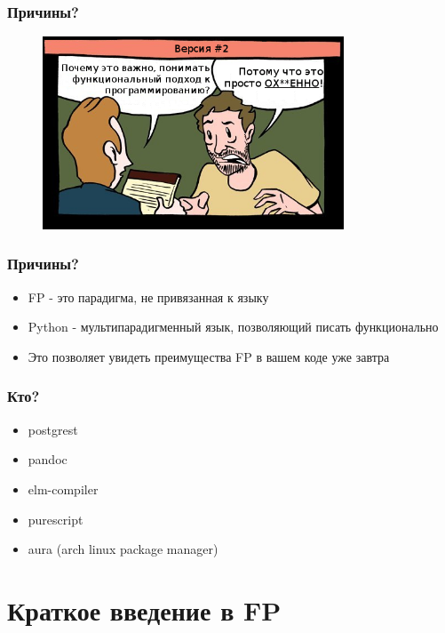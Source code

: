 \documentclass[14pt, compress, aspectratio=169]{beamer}
\begin{document}
\begin{frame}
    \frametitle{Причины?}
    \vspace{-35pt}
    \begin{figure}
        \includegraphics[width=0.8\textwidth,center]{second_option.png}
    \end{figure}
\end{frame}

\begin{frame}[fragile]
    \frametitle{Причины?}
    \begin{itemize}[label={\MVRightarrow}]
        \item FP - это парадигма, не привязанная к языку
        \item Python - мультипарадигменный язык, позволяющий писать функционально
        \item Это позволяет увидеть преимущества FP в вашем коде уже завтра
    \end{itemize}
\end{frame}

\begin{frame}[fragile]
    \frametitle{Кто?}
    \begin{itemize}[label={\MVRightarrow}]
        \item postgrest
        \item pandoc
        \item elm-compiler
        \item purescript
        \item aura (arch linux package manager)
    \end{itemize}
\end{frame}

\section{Краткое введение в FP}
\end{document}
